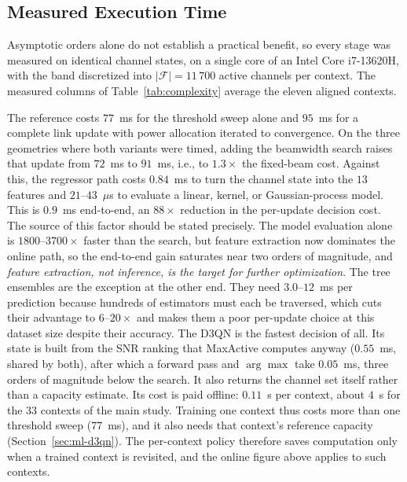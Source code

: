 \documentclass[correspondence]{IEEEtaes}
\newcommand{\PLNCH}{11\,700}          %
\newcommand{\PLMASEL}{$77$~ms}        %
\newcommand{\PLMASTEP}{$95$~ms}       %
\newcommand{\PLMASTEPBW}{$91$~ms}     %
\newcommand{\PLPREDUS}{$0.9$~ms}      %
\begin{document}
\subsection{Measured Execution Time}
\label{sec:runtime}
Asymptotic orders alone do not establish a practical benefit, so every stage was measured on
identical channel states, on a single core of an Intel Core i7-13620H, with the band
discretized into $|\mathcal{F}|=\PLNCH$ active channels per context. The measured columns
of Table~\ref{tab:complexity} average the eleven aligned contexts.

The reference costs \PLMASEL{} for the threshold sweep alone and \PLMASTEP{} for a complete
link update with power allocation iterated to convergence. On the three geometries where
both variants were timed, adding the beamwidth search raises that update from $72$~ms to
\PLMASTEPBW{}, i.e., to $1.3\times$ the fixed-beam cost. Against this, the regressor path
costs $0.84$~ms to turn the channel state into the $13$ features and $21$--$43$~$\mu$s to
evaluate a linear, kernel, or Gaussian-process model. This is \PLPREDUS{} end-to-end, an
$88\times$ reduction in the per-update decision cost. The source of this factor should be
stated precisely. The model evaluation alone is $1800$--$3700\times$ faster than the
search, but feature extraction now dominates the online path, so the end-to-end gain
saturates near two orders of magnitude, and \emph{feature extraction, not inference, is
the target for further optimization}. The tree ensembles are the exception at the other
end. They need $3.0$--$12$~ms per prediction because hundreds of estimators must each be
traversed, which cuts their advantage to $6$--$20\times$ and makes them a poor per-update
choice at this dataset size despite their accuracy. The D3QN is the fastest decision of
all. Its state is built from the SNR ranking that MaxActive computes anyway ($0.55$~ms,
shared by both), after which a forward pass and $\arg\max$ take $0.05$~ms, three orders of
magnitude below the search. It also returns the channel set itself rather than a capacity
estimate. Its cost is paid offline: $0.11$~s per context, about $4$~s for the $33$
contexts of the main study. Training one context thus costs more than one threshold
sweep (\PLMASEL{}), and it also needs that context's reference capacity
(Section~\ref{sec:ml-d3qn}). The per-context policy therefore saves computation only
when a trained context is revisited, and the online figure above applies to such
contexts.
\end{document}
